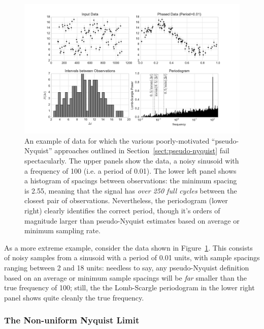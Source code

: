 \documentclass[preprint]{aastex}
\newcommand{\fig}[1]{Figure~\ref{fig:#1}}
\newcommand{\figlabel}[1]{\label{fig:#1}}
\newcommand{\Sect}[1]{Section~\ref{sect:#1}}
\newcommand{\sect}[1]{\Sect{#1}}
\begin{document}
\begin{figure}[ht]
  \centering
  \includegraphics[width=\textwidth]{fig12_pseudo_nyquist}
  \caption{An example of data for which the various poorly-motivated
    ``pseudo-Nyquist'' approaches outlined in \sect{pseudo-nyquist} fail
    spectacularly. The upper panels show the data, a noisy sinusoid with
    a frequency of 100 (i.e. a period of 0.01).
    The lower left panel shows a histogram of spacings between observations:
    the minimum spacing is 2.55, meaning that the signal has
    {\it over 250 full cycles} between the closest pair of observations.
    Nevertheless, the periodogram (lower right) clearly identifies the correct
    period, though it's orders of magnitude larger than pseudo-Nyquist
    estimates based on average or minimum sampling rate.
    \figlabel{pseudo-nyquist}}
\end{figure}

As a more extreme example, consider the data shown in \fig{pseudo-nyquist}.
This consists of noisy samples from a sinusoid with a period of 0.01 units,
with sample spacings ranging between 2 and 18 units: needless to say, any
pseudo-Nyquist definition based on an average or minimum sample spacings
will be {\it far} smaller than the true frequency of 100; still, the
the Lomb-Scargle periodogram in the lower right panel shows quite cleanly
the true frequency.

\subsubsection{The Non-uniform Nyquist Limit}
\end{document}
